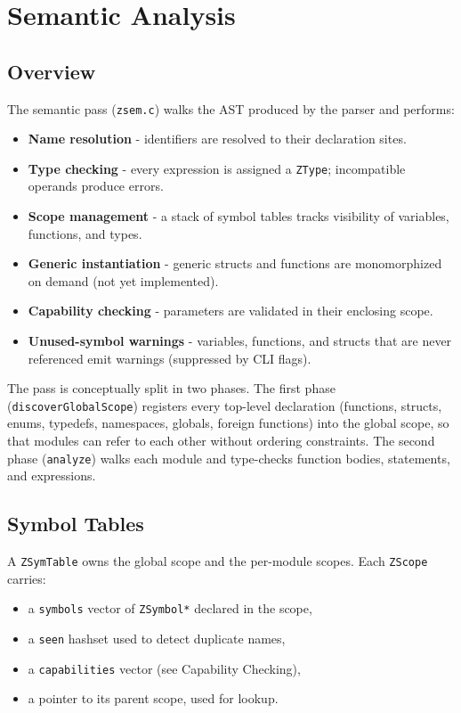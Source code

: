 \chapter{Semantic Analysis}
\label{ch:semantics}


\section{Overview}

The semantic pass (\texttt{zsem.c}) walks the AST produced by the parser and performs:

\begin{itemize}
  \item \textbf{Name resolution} - identifiers are resolved to their declaration sites.
  \item \textbf{Type checking} - every expression is assigned a \texttt{ZType}; incompatible operands produce errors.
  \item \textbf{Scope management} - a stack of symbol tables tracks visibility of variables, functions, and types.
  \item \textbf{Generic instantiation} - generic structs and functions are monomorphized on demand (not yet implemented).
  \item \textbf{Capability checking} -  parameters are validated in their enclosing scope.
  \item \textbf{Unused-symbol warnings} - variables, functions, and structs that are never referenced emit warnings (suppressed by CLI flags).
\end{itemize}

The pass is conceptually split in two phases. The first phase
(\texttt{discoverGlobalScope}) registers every top-level declaration
(functions, structs, enums, typedefs, namespaces, globals, foreign
functions) into the global scope, so that modules can refer to each
other without ordering constraints. The second phase (\texttt{analyze})
walks each module and type-checks function bodies, statements, and
expressions.

\section{Symbol Tables}

A \texttt{ZSymTable} owns the global scope and the per-module scopes.
Each \texttt{ZScope} carries:

\begin{itemize}
  \item a \texttt{symbols} vector of \texttt{ZSymbol*} declared in the scope,
  \item a \texttt{seen} hashset used to detect duplicate names,
  \item a \texttt{capabilities} vector (see Capability Checking),
  \item a pointer to its parent scope, used for lookup.
\end{itemize}


